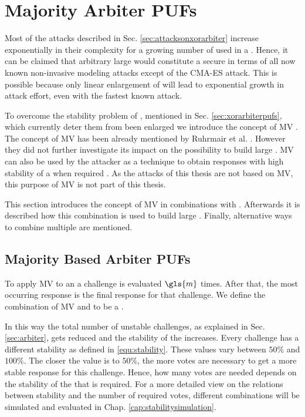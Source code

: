 \chapter{Majority Arbiter PUFs}
\label{cap:majorityarbiter}

Most of the attacks described in Sec. \ref{sec:attacksonxorarbiter} increase exponentially in their complexity for a growing number of used \apufs in a \xpuf.  %
Hence, it can be claimed that arbitrary large \xpufs would constitute a secure \puf in terms of all now known non-invasive modeling attacks except of the \ac{CMA-ES} attack.
This is possible because only linear enlargement of \xpufs will lead to exponential growth in attack effort, even with the fastest known attack.

To overcome the stability problem of \xpufs, mentioned in Sec. \ref{sec:xorarbiterpufs}, which currently deter them from been enlarged we introduce the concept of \ac{MV} \cite{Majzoobi2010FPGALines}. %
The concept of \ac{MV} has been already mentioned by Ruhrmair et al. \cite{Ruhrmair2013PUFData}.
However they did not further investigate its impact on the possibility to build large \xpufs. %
\ac{MV} can also be used by the attacker as a technique to obtain responses with high stability of a \puf when required \cite{Ganji2016PACPUFs, Ozturk2008TowardsDevices}.
As the attacks of this thesis are not based on \ac{MV}, this purpose of \ac{MV} is not part of this thesis.

This section introduces the concept of \ac{MV} in combinations with \apufs.
Afterwards it is described how this combination is used to build large \xpufs.
Finally, alternative ways to combine multiple \apufs are mentioned.

\section{Majority Based Arbiter PUFs}
\label{sec:majorityarbiter}

To apply \ac{MV} to an \apuf a challenge is evaluated $\gls{m}$ times.
After that, the most occurring response is the final response for that challenge.
We define the combination of \ac{MV} and \apuf to be a \mpuf.

In this way the total number of unstable challenges, as explained in Sec. \ref{sec:arbiter}, gets reduced and the stability of the \apuf increases. %
Every challenge has a different stability as defined in \ref{equ:stability}.%
These values vary between $50 \%$ and $100 \%$.
The closer the value is to $50 \%$, the more votes are necessary to get a more stable response for this challenge. %
Hence, how many votes are needed depends on the stability of the \apuf that is required. 
For a more detailed view on the relations between stability and the number of required votes, different combinations will be simulated and evaluated in Chap. \ref{cap:stabilitysimulation}.

